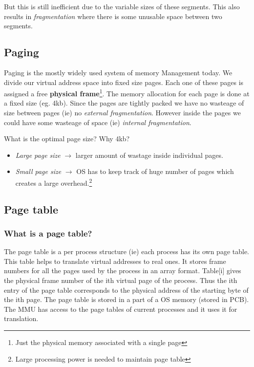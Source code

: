 \documentclass[12pt]{article}
\newcommand{\tbox}[1]{\noindent\fbox{\parbox{\textwidth}{#1}}}
\begin{document}
But this is still inefficient due to the variable sizes of these segments. This also results in \textit{fragmentation} where there is some unusable space between two segments. 

\subsection{Paging}
Paging is the mostly widely used system of memory Management today. We divide our virtual address space into fixed size pages. Each one of these pages is assigned a free \textbf{physical frame}\footnote{Just the physical memory associated with a single page}.
The memory allocation for each page is done at a fixed size (eg. 4kb). Since the pages are tightly packed we have no wasteage of size between pages (ie) no \textit{external fragmentation}. However inside the pages we could have some wasteage of space (ie) \textit{internal fragmentation}.

What is the optimal page size? Why 4kb?
\begin{itemize}[topsep=0pt, partopsep=0pt, itemsep=0pt, parsep=0pt]
    \item \textit{Large page size} \(\rightarrow\) larger amount of wastage inside individual pages.
    \item \textit{Small page size} \(\rightarrow\) OS has to keep track of huge number of pages which creates a large overhead.\footnote{Large processing power is needed to maintain page table}
\end{itemize}
\newpage

\noindent\tbox{
    \begin{center}
    \textbf{\Huge Lecture 13}
    \end{center}
}
\subsection{Page table}
\subsubsection*{What is a page table?}
The page table is a per process structure (ie) each process has its own page table. This table helps to translate
virtual addresses to real ones. It stores frame numbers for all the pages used by the process in an array format. 
Table[i] gives the physical frame number of the ith virtual page of the process. Thus the ith entry of the page table corresponds to the physical address of the starting byte of the ith page. The page table is stored in a part of a OS memory (stored in PCB). The MMU has 
access to the page tables of current processes and it uses it for translation. 
\end{document}

